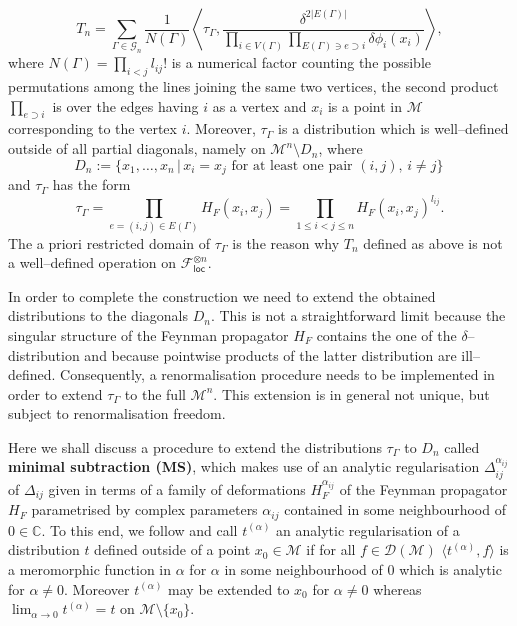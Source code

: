 \documentclass[10pt]{book}
\newcommand{\loc}{\mathsf{loc}}
\newcommand{\Dcal}{\mathcal{D}}
\newcommand{\Mcal}{\mathcal{M}}
\theoremstyle{break}
\begin{document}
\begin{equation}
T_n = \sum_{\Gamma\in \mathcal{G}_n}  \frac{1}{N(\Gamma)}    \left\langle  \tau_\Gamma  , \frac{\delta^{2|E(\Gamma)|}}{  \prod_{i \in V(\Gamma)} \prod_{E(\Gamma)\ni e \supset i}    \delta \phi_i(x_{i}) } \right\rangle,
\end{equation}
where $N(\Gamma)= \prod_{i<j} l_{ij}! $ is a numerical factor counting the possible permutations among the lines joining the same two vertices, the second product $\prod_{e \supset i} $ is over the edges having $i$ as a vertex and $x_{i}$ is a point in $\Mcal$ corresponding to the vertex $i$.
Moreover, $\tau_\Gamma$  is a distribution which is well--defined outside of all partial diagonals, namely on
$\Mcal^n\setminus D_n$, where 
%
\begin{equation}
D_n:=\{x_1,\ldots,x_n\,|\, x_i=x_j \text{ for at least one pair } (i,j),\, i\neq j \}\,
\end{equation}
%
and $\tau_\Gamma$ has the form
%
\begin{equation}
\tau_\Gamma = \prod_{e=(i,j)\in E(\Gamma)} H_F(x_{i},x_{j})=\prod_{1\le i<j\le n} H_F(x_{i},x_{j})^{l_{ij}}.
\end{equation}
%
The a priori restricted domain of $\tau_\Gamma$ is the reason why $T_n$ defined as above is not a well--defined operation on $\mathcal{F}_\loc^{\otimes n}$.

In order to complete the construction we need to extend the obtained distributions to the diagonals $D_n$. This is not a straightforward limit because the singular structure of the Feynman propagator $H_F$ contains the one of the $\delta$--distribution and because pointwise products of the latter distribution are ill--defined. Consequently, a renormalisation procedure needs to be implemented in order to extend $\tau_\Gamma$ to the full $\Mcal^n$. This extension is in general not unique, but subject to renormalisation freedom.

Here we shall discuss a procedure to extend the distributions $\tau_\Gamma$ to $D_n$ called {\bf minimal subtraction (MS)}, which makes use of an analytic regularisation $\Delta^{\alpha_{ij}}_{ij}$ of $\Delta_{ij}$ given in terms of a family of deformations $H_F^{\alpha_{ij}}$ of the Feynman propagator $H_F$ parametrised by complex parameters $\alpha_{ij}$ contained in some neighbourhood of $0\in\mathbb{C}$. To this end, we follow %
and call $t^{(\alpha)}$ an analytic regularisation of a distribution $t$ defined outside of a point $x_0\in\Mcal$ if for all $f\in\Dcal(\Mcal)$ $\langle t^{(\alpha)}, f\rangle$ is a meromorphic function in $\alpha$ for $\alpha$ in some neighbourhood of $0$ which is analytic for $\alpha\neq 0$. Moreover $t^{(\alpha)}$ may be extended to $x_0$ for $\alpha\neq 0$ whereas $\lim_{\alpha\to 0}t^{(\alpha)}=t$ on $\Mcal\setminus\{x_0\}$.
\end{document}
